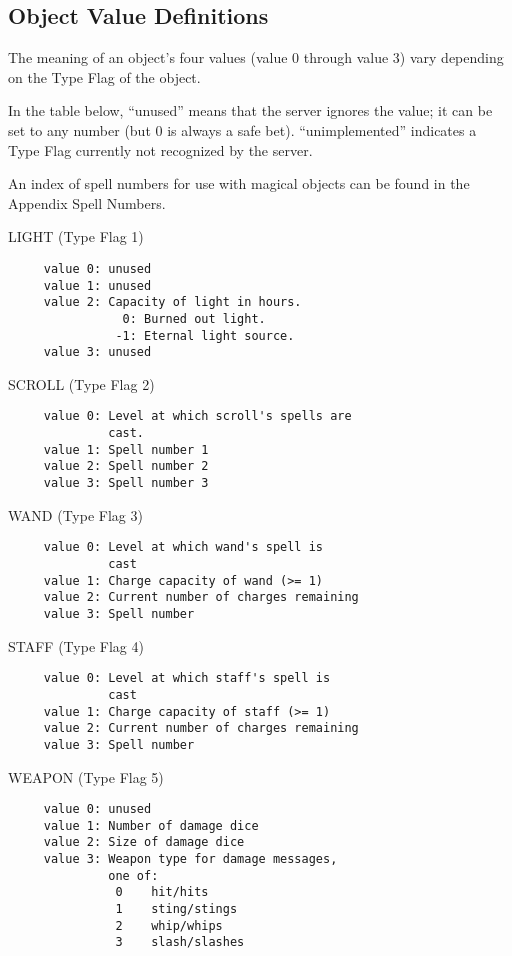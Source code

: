 \documentclass[11pt]{article}
\newenvironment{Ventry}[1]
  {\begin{list}{}{\renewcommand{\makelabel}[1]{\textsf{##1:}\hfil}
    \settowidth{\labelwidth}{\textsf{#1:}}
    \setlength{\leftmargin}{\labelwidth}
    \addtolength{\leftmargin}{\labelsep}
  }
  }
  {\end{list}}
\begin{document}
\subsection{Object Value Definitions}
The meaning of an object's four values (value 0 through value 3) vary depending on the Type Flag of the object.
\par
In the table below, ``unused'' means that the server ignores the value; it can be set to any number (but 0 is always a safe bet).  ``unimplemented'' indicates a Type Flag currently not recognized by the server.
\par
An index of spell numbers for use with magical objects can be found in the Appendix Spell Numbers.
\begin{Ventry}{DRINK CONTAINER}
\item[LIGHT] (Type Flag 1)
\begin{verbatim}
     value 0: unused
     value 1: unused
     value 2: Capacity of light in hours.
                0: Burned out light.
               -1: Eternal light source.
     value 3: unused
\end{verbatim}
\item[SCROLL] (Type Flag 2)
\begin{verbatim}
     value 0: Level at which scroll's spells are
              cast.
     value 1: Spell number 1
     value 2: Spell number 2
     value 3: Spell number 3
\end{verbatim}
\item[WAND] (Type Flag 3)
\begin{verbatim}
     value 0: Level at which wand's spell is
              cast
     value 1: Charge capacity of wand (>= 1)
     value 2: Current number of charges remaining
     value 3: Spell number
\end{verbatim}
\item[STAFF] (Type Flag 4)
\begin{verbatim}
     value 0: Level at which staff's spell is
              cast
     value 1: Charge capacity of staff (>= 1)
     value 2: Current number of charges remaining
     value 3: Spell number
\end{verbatim}
\item[WEAPON] (Type Flag 5)
\begin{verbatim}
     value 0: unused
     value 1: Number of damage dice
     value 2: Size of damage dice
     value 3: Weapon type for damage messages,
              one of:
               0    hit/hits
               1    sting/stings
               2    whip/whips
               3    slash/slashes

\end{verbatim}
\end{Ventry}
\end{document}
